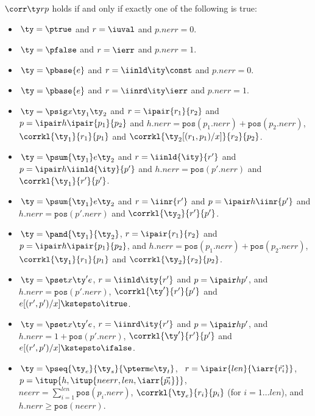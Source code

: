 \begin{definition}
$\corr \ty r p$ holds if and only if exactly one of the following is true:
  \begin{itemize}
  \item $\,\ty = \ptrue$ and $r = \iuval$ and $p.{nerr} = 0$.
  \item $\,\ty = \pfalse$ and $r = \ierr$ and $p.{nerr} = 1$.
  \item $\,\ty = \pbase{e}$ and $r = \iinld \ity \const$ and $p.{nerr} = 0$.
  \item $\,\ty = \pbase{e}$ and $r = \iinrd \ity \ierr$ and $p.{nerr} = 1$.
  \item $\,\ty = \psig x {\ty_1} {\ty_2}$ and $r =\ipair {r_1} {r_2}$ and $p =
    \ipair h {\ipair {p_1} {p_2}}$ 
    and $h.{nerr} = \mathtt{pos}(p_1.{nerr}) + \mathtt{pos}(p_2.{nerr})$, $\corrkl
    {\ty_1} {r_1} {p_1}$ and $\corrkl {\ty_2[(r_1,p_1)/x]} {r_2} {p_2}$.
  \item $\,\ty = \psum {\ty_1} e {\ty_2}$ and $r =\iinld {\ity}{r'}$
    and $p = \ipair h {\iinld {\ity}{p'}}$
    and $h.{nerr} = \mathtt{pos}(p'.{nerr})$ and $\corrkl
    {\ty_1} {r'} {p'}$.
  \item $\,\ty = \psum {\ty_1} e {\ty_2}$ and $r =\iinr {r'}$
    and $p = \ipair h {\iinr {p'}}$
    and $h.{nerr} = \mathtt{pos}(p'.{nerr})$ and $\corrkl
    {\ty_2} {r'} {p'}$.
  \item $\,\ty = \pand {\ty_1} {\ty_2}$, $r = \ipair {r_1} {r_2}$ and $p =
    \ipair h {\ipair {p_1}{p_2}}$, 
    and $h.{nerr} = \mathtt{pos}(p_1.{nerr}) + \mathtt{pos}(p_2.{nerr})$, 
    $\corrkl {\ty_1} {r_1} {p_1}$ and $\corrkl {\ty_2} {r_2} {p_2}$.
  \item $\,\ty = \pset x {\ty'} e$, $r = \iinld \ity {r'}$ and $p =
    \ipair h {p'}$, 
    and $h.{nerr} = \mathtt{pos}(p'.{nerr})$, $\corrkl {\ty'}{r'}{p'}$
    and $e[(r',p')/x] \kstepsto\itrue$.
  \item $\,\ty = \pset x {\ty'} e$, $r = \iinrd \ity {r'}$
    and $p = \ipair h {p'}$,
    and $h.{nerr} = 1 + \mathtt{pos}(p'.{nerr})$,
    $\corrkl {\ty'}{r'}{p'}$ and $e[(r',p')/x] \kstepsto \ifalse$.
  \item $\,\ty = \pseq {\ty_e}{\ty_s}{\pterm e {\ty_t}}$, \
    $r = \ipair {len} {\iarr{\vec {r_i}}}$, \
    $p = \itup{h,\itup{{neerr},{len},\iarr {\vec {p_i}}}}$,\\
    ${neerr} = \sum_{i=1}^{len} \mathtt{pos}(p_i.{nerr})$, 
    $\corrkl {\ty_e}
    {r_i} {p_i}$ (for $i=1 \ldots {len}$), and
    $h.{nerr} \geq \mathtt{pos}({neerr})$.

\end{itemize}
\end{definition}

